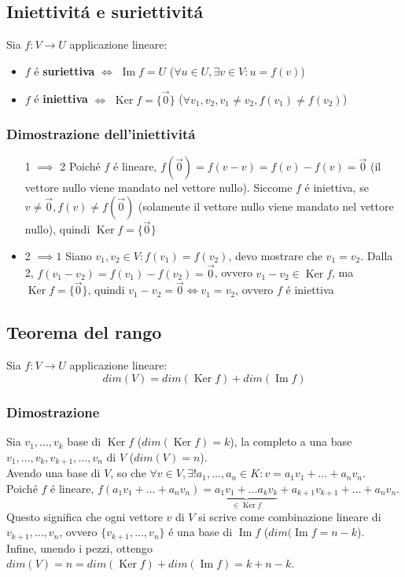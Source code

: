 \documentclass{article}
\DeclareMathOperator{\Ker}{Ker}
\DeclareMathOperator{\Ima}{Im}
\begin{document}
\subsection{Iniettivitá e suriettivitá}
Sia $f : V \to U$ applicazione lineare:
\begin{itemize}
	\item $f$ é \textbf{suriettiva} $\iff$ $\Ima{f} = U$ ($\forall u \in U, \exists v \in V : u = f(v)$)
	\item $f$ é \textbf{iniettiva} $\iff$ $\Ker{f} = \{\vec{0}\}$ ($\forall v_1, v_2, v_1 \ne v_2, f(v_1) \ne f(v_2)$)
\end{itemize}

\subsubsection{Dimostrazione dell'iniettivitá}
\begin{itemize}
	\item[1 $\implies$ 2] Poiché $f$ é lineare, $f(\vec{0}) = f(v-v) = f(v) - f(v) = \vec{0}$ (il vettore nullo viene mandato nel vettore nullo). Siccome $f$ é iniettiva, se $v \ne \vec{0}, f(v) \ne f(\vec{0})$ (solamente il vettore nullo viene mandato nel vettore nullo), quindi $\Ker{f} = \{\vec{0}\}$
	\item 2 $\implies 1$ Siano $v_1, v_2 \in V : f(v_1) = f(v_2)$, devo mostrare che $v_1 = v_2$. Dalla 2, $f(v_1 - v_2) = f(v_1) - f(v_2) = \vec{0}$, ovvero $v_1 - v_2 \in \Ker{f}$, ma $\Ker{f} = \{\vec{0}\}$, quindi $v_1 - v_2 = \vec{0} \iff v_1 = v_2$, ovvero $f$ é iniettiva
\end{itemize}

\subsection{Teorema del rango}
Sia $f : V \to U$ applicazione lineare:
$$dim(V) = dim(\Ker{f}) + dim(\Ima{f})$$

\subsubsection{Dimostrazione}
Sia $v_1, \dots, v_k$ base di $\Ker{f}$ ($dim(\Ker{f}) = k$), la completo a una base $v_1, \dots, v_k, v_{k+1}, \dots, v_n$ di $V$ ($dim(V) = n$).\\
Avendo una base di $V$, so che $\forall v \in V, \exists! a_1, \dots, a_n \in K : v = a_1v_1 + \dots + a_nv_n$.\\
Poiché $f$ é lineare, $f(a_1v_1 + \dots + a_nv_n) = \underbrace{a_1v_1 + \dots a_kv_k}_{\in \Ker{f}} + a_{k+1}v_{k+1} + \dots + a_nv_n$.\\
Questo significa che ogni vettore $v$ di $V$ si scrive come combinazione lineare di $v_{k+1}, \dots, v_n$, ovvero $\{v_{k+1}, \dots, v_n\}$ é una base di $\Ima{f}$ ($dim(\Ima{f} = n - k$).\\
Infine, unendo i pezzi, ottengo $dim(V) = n = dim(\Ker{f}) + dim(\Ima{f}) = k + n - k$.
\end{document}
